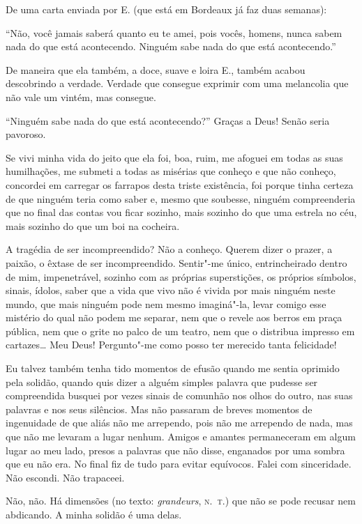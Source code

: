 De uma carta enviada por E. (que está em Bordeaux já faz duas semanas):

``Não, você jamais saberá quanto eu te amei, pois vocês, homens, nunca
sabem nada do que está acontecendo. Ninguém sabe nada do que está
acontecendo.''

De maneira que ela também, a doce, suave e loira E., também acabou
descobrindo a verdade. Verdade que consegue exprimir com uma
melancolia que não vale um vintém, mas consegue.

``Ninguém sabe nada do que está acontecendo?'' Graças a Deus! Senão
seria pavoroso.

Se vivi minha vida do jeito que ela foi, boa, ruim, me
afoguei em todas as suas humilhações, me submeti a todas as
misérias que conheço e que não conheço, concordei em carregar os
farrapos desta triste existência, foi porque tinha certeza de que
ninguém teria como saber e, mesmo que soubesse, ninguém
compreenderia que no final das contas vou ficar sozinho, mais sozinho
do que uma estrela no céu, mais sozinho do que um boi na cocheira.

A tragédia de ser incompreendido? Não a conheço. Querem dizer o prazer,
a paixão, o êxtase de ser incompreendido. Sentir"-me único,
entrincheirado dentro de mim, impenetrável, sozinho com as próprias
superstições, os próprios símbolos, sinais, ídolos, saber que a vida
que vivo não é vivida por mais ninguém neste mundo, que mais ninguém
pode nem mesmo imaginá"-la, levar comigo esse mistério do qual não podem
me separar, nem que o revele aos berros em praça pública, nem que
o grite no palco de um teatro, nem que o distribua impresso em
cartazes\ldots{} Meu Deus! Pergunto"-me como posso ter merecido tanta
felicidade!

Eu talvez também tenha tido momentos de efusão quando me sentia
oprimido pela solidão, quando quis dizer a alguém simples palavra
que pudesse ser compreendida busquei por vezes sinais de
comunhão nos olhos do outro, nas suas palavras e nos seus silêncios. Mas
não passaram de breves momentos de ingenuidade de que aliás não me
arrependo, pois não me arrependo de nada, mas que não me levaram a lugar
nenhum. Amigos e amantes permaneceram em algum lugar ao meu lado, presos
a palavras que não disse, enganados por uma sombra que eu não era. No
final fiz de tudo para evitar equívocos. Falei com sinceridade. Não
escondi. Não trapaceei.

Não, não. Há dimensões (no texto: \emph{grandeurs}, \textsc{n.~t.}) que não se
pode recusar nem abdicando. A minha solidão é uma delas.

